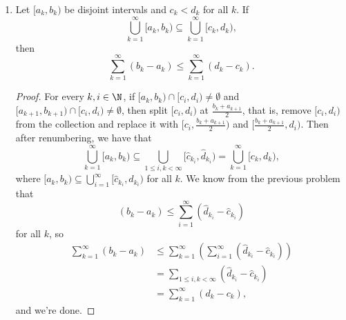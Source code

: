 \documentclass[12pt,letterpaper]{article}
\begin{document}
\begin{enumerate}[resume]
\begin{enumerate}[label=(\roman*)]
\begin{proof}
	For any $i,j$ such that $[a_i,b_i)\cap[a_j,b_j)\neq\emptyset$, we can write 
	$$[a_i,b_i)\cup[a_j,b_j)=[a_i,a_j)\cup[a_j,b_i)\cup[b_i,b_j),$$
	and note that 
	\begin{align*}
	(b_i-a_i)+(b_j-a_j)&=(a_j-a_i)+2(b_i-a_j)+(b_j-b_i)\\
	&>(a_j-a_i)+(b_i-a_j)+(b_j-b_i).
	\end{align*}
	So any finite nondisjoint union of intervals $[a_i,b_i)$ can be rewritten as a finite disjoint union with smaller length. Thus we can renumber and write 
	$$[a,b-\epsilon]\subseteq\coprod_{i=1}^n[\hat{a}_i,\hat{b}_i)=\bigcup_{i=1}^n[a_{k_i},b_{k_i}).$$
	Since there are no extraneous intervals, then $\hat{a}_1\leq a$, and $b-\epsilon < \hat{b}_n$, and $\hat{b}_i=\hat{a}_{i+1} $ for all $i$. Thus 
	$$(b-a)-\epsilon\leq (\hat{b}_n-\hat{a}_1) = \sum_{i=1}^n(\hat{b}_i-\hat{a}_i) < \sum_{i=1}^n(b_{k_i}-a_{k_i}) < \sum_{k=1}^\infty(b_{k}-a_{k}),$$
	Since this holds for all $\epsilon>0$, we can let $\epsilon\to0$ and find that 
		$$b-a\leq\sum_{k=1}^\infty(b_k-a_k),$$
		as desired. 
	\end{proof}
	\item Let $[a_k,b_k)$ be disjoint intervals and $c_k<d_k$ for all $k$. If 
	$$\bigcup_{k=1}^\infty[a_k,b_k)\subseteq\bigcup_{k=1}^\infty[c_k,d_k),$$
	then 
	$$\sum_{k=1}^\infty(b_k-a_k)\leq\sum_{k=1}^\infty(d_k-c_k).$$
	\begin{proof}
	For every $k,i\in\N$, if $[a_k,b_k)\cap[c_i,d_i)\neq\emptyset$ and   $[a_{k+1},b_{k+1})\cap[c_i,d_i)\neq\emptyset$, then split $[c_i,d_i)$ at $\frac{b_k+a_{k+1}}{2}$, that is, remove $[c_i,d_i)$ from the collection and replace it with $[c_i,\frac{b_k+a_{k+1}}{2})$ and $[\frac{b_k+a_{k+1}}{2},d_i)$. Then after renumbering, we have that 
	$$\bigcup_{k=1}^\infty[a_k,b_k)\subseteq\bigcup_{1\leq i,k < \infty}[\hat{c}_{k_i},\hat{d}_{k_i})=\bigcup_{k=1}^\infty[c_k,d_k),$$
	where $[a_k,b_k)\subseteq\bigcup_{i=1}^\infty[\hat{c}_{k_i},\hat{d}_{k_i})$ for all $k$. We know from the previous problem that 
	$$(b_k-a_k)\leq\sum_{i=1}^\infty(\hat{d}_{k_i}- \hat{c}_{k_i})$$
	for all $k$, so
	\begin{align*}
	\sum_{k=1}^\infty(b_k-a_k)&\leq\sum_{k=1}^\infty\left(\sum_{i=1}^\infty(\hat{d}_{k_i}- \hat{c}_{k_i})\right)\\	
	&=\sum_{1\leq i,k < \infty}(\hat{d}_{k_i}- \hat{c}_{k_i})\\
	&=\sum_{k=1}^\infty(d_k-c_k),
	\end{align*}
	and we're done.
	\end{proof}
	\end{enumerate}


\end{enumerate}
\end{document}

